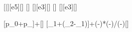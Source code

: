 [\bar][e5][\pascal]
[\degreeCelsius]
[\kilo\pascal][e3][\pascal]
[\degreeCelsius]
[\kilo\pascal][e3][\pascal]

[p_0+p_]{\ncpoX+\pUeX}[\pascal]
[\vartheta_1+\left(\vartheta_2-\vartheta_1\right)]{\thAX+(\thBX-\thAX)*(\pTX-\psAX)/(\psBX-\psAX)}[\degreeCelsius]
